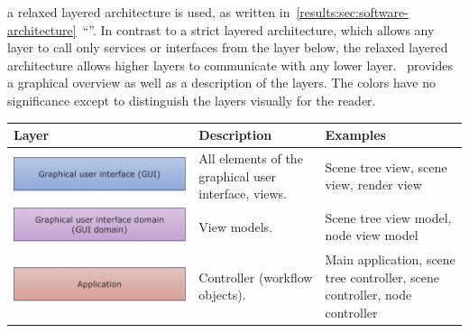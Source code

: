 \documentclass[%
    a4paper,    %
    justified,  %
    nobib,      %
    openany     %
]{tufte-book}
\begin{document}
 a relaxed layered architecture
is used, as written
in~\autoref{results:sec:software-architecture}~\enquote{}.
In contrast to a strict layered architecture, which allows any layer to call
only services or interfaces from the layer below, the relaxed layered
architecture allows higher layers to communicate with any lower
layer.~ provides a graphical overview as well as a
description of the layers. The colors have no significance except to distinguish
the layers visually for the reader.

\begin{table}[h]
  \begin{tabularx}{\textwidth}{XXX}
    \toprule
    \textbf{Layer} & \textbf{Description} & \textbf{Examples} \\
    \midrule
    \includegraphics[width=0.9\linewidth]{images/layers-gui}         & All elements of the graphical user interface, views.                                & Scene tree view, scene view, render view                                   \\
    \includegraphics[width=1.0\linewidth]{images/layers-gui-domain}  & View models.                                                                        & Scene tree view model, node view model                                     \\
    \includegraphics[width=1.0\linewidth]{images/layers-application} & Controller (workflow objects).                                                      & Main application, scene tree controller, scene controller, node controller \\

\end{tabularx}
\end{table}
\end{document}
